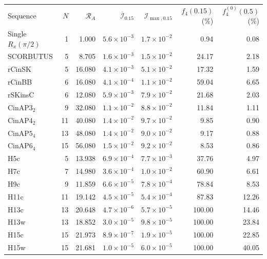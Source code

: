 \documentclass[10pt,aps,twocolumn,pra,floatfix,superscriptaddress]{revtex4-2}
\begin{document}
\begin{table}[tp]
\centering\small
\setlength{\tabcolsep}{4pt}
\begin{ruledtabular}
\begin{tabular}{lrrrrrr}
Sequence & $N$ & $\mathcal R_A$ & $\overline{\mathcal I}_{0.15}$ & $\mathcal I_{\max,0.15}$ & $f_4(0.15)$ (\%) & $f_4^{(0)}(0.5)$ (\%) \\
Single $R_x(\pi/2)$ & 1 & 1.000 & $5.6\times10^{-3}$ & $1.7\times10^{-2}$ & 0.94 & 0.08 \\
SCORBUTUS & 5 & 8.705 & $1.6\times10^{-3}$ &
$1.5\times10^{-2}$ & 24.17 & 2.18 \\
rCinSK & 5 & 16.080 & $4.1\times10^{-3}$ & $5.1\times10^{-2}$ & 17.32 & 1.59 \\
rCinBB & 6 & 16.080 & $4.1\times10^{-4}$ & $1.1\times10^{-2}$ & 59.04 & 6.65 \\
rSKinsC & 6 & 12.080 & $5.9\times10^{-3}$ & $7.9\times10^{-2}$ & 21.68 & 2.03 \\
$\mathrm{CinAP3}_{2}$ & 9 & 32.080 & $1.1\times10^{-2}$ & $8.8\times10^{-2}$ & 11.84 & 1.11 \\
$\mathrm{CinAP4}_{2}$ & 11 & 40.080 & $1.4\times10^{-2}$ & $9.7\times10^{-2}$ & 9.85 & 0.90 \\
$\mathrm{CinAP5}_{4}$ & 13 & 48.080 & $1.4\times10^{-2}$ & $9.0\times10^{-2}$ & 9.17 & 0.88 \\
$\mathrm{CinAP6}_{4}$ & 15 & 56.080 & $1.5\times10^{-2}$ & $9.2\times10^{-2}$ & 8.53 & 0.86 \\
H5c & 5 & 13.938 & $6.9\times10^{-4}$ & $7.7\times10^{-3}$ & 37.76 & 4.97 \\
H7c & 7 & 14.980 & $3.6\times10^{-4}$ & $1.0\times10^{-2}$ & 60.90 & 6.61 \\
H9c & 9 & 11.859 & $6.6\times10^{-5}$ & $7.8\times10^{-4}$ & 78.84 & 8.53 \\
H11c & 11 & 19.142 & $4.5\times10^{-5}$ & $5.4\times10^{-4}$ & 87.83 & 12.26 \\
H13c & 13 & 20.648 & $4.7\times10^{-6}$ & $5.7\times10^{-5}$ & 100.00 & 14.46 \\
H13w & 13 & 18.852 & $3.0\times10^{-5}$ & $9.8\times10^{-5}$ & 100.00 & 23.84 \\
H15c & 15 & 21.973 & $8.9\times10^{-7}$ & $1.9\times10^{-5}$ & 100.00 & 22.85 \\
H15w & 15 & 21.681 & $1.0\times10^{-5}$ & $6.0\times10^{-5}$ & 100.00 & 40.05 \\
\end{tabular}
\end{ruledtabular}

\end{table}
\end{document}

